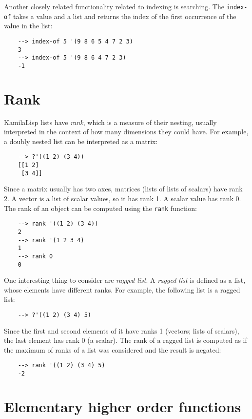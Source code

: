 Another closely related functionality related to indexing is searching. The \verb|index-of| takes a value and a list and returns the index of the first occurrence of the value in the list:

\begin{Verbatim}
    --> index-of 5 '(9 8 6 5 4 7 2 3)
    3
    --> index-of 5 '(9 8 6 4 7 2 3)
    -1
\end{Verbatim}

\section{Rank}

KamilaLisp lists have \textit{rank}, which is a measure of their nesting, usually interpreted in the context of how many dimensions they could have. For example, a doubly nested list can be interpreted as a matrix:

\begin{Verbatim}
    --> ?'((1 2) (3 4))
    [[1 2]
     [3 4]]
\end{Verbatim}

Since a matrix usually has two axes, matrices (lists of lists of scalars) have rank 2. A vector is a list of scalar values, so it has rank 1. A scalar value has rank 0. The rank of an object can be computed using the \verb|rank| function:

\begin{Verbatim}
    --> rank '((1 2) (3 4))
    2
    --> rank '(1 2 3 4)
    1
    --> rank 0
    0
\end{Verbatim}

One interesting thing to consider are \textit{ragged list}. A \textit{ragged list} is defined as a list, whose elements have different ranks. For example, the following list is a ragged list:

\begin{Verbatim}
    --> ?'((1 2) (3 4) 5)
\end{Verbatim}

Since the first and second elements of it have ranks 1 (vectors; lists of scalars), the last element has rank 0 (a scalar). The rank of a ragged list is computed as if the maximum of ranks of a list was considered and the result is negated:

\begin{Verbatim}
    --> rank '((1 2) (3 4) 5)
    -2
\end{Verbatim}

\section{Elementary higher order functions}

